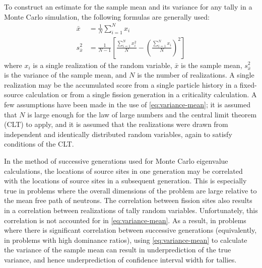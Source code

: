 To construct an estimate for the sample mean and its variance for any tally in a
Monte Carlo simulation, the following formulas are generally used:
\begin{align}
  \bar{x} &= \frac{1}{N} \sum_{i=1}^N x_i \\ 
  \label{eq:variance-mean} s^2_{\bar{x}} &= \frac{1}{N-1}
  \left [ \frac{\sum_{i=1}^N x_i^2}{N} - \left ( \frac{\sum_{i=1}^N x_i}{N}
    \right )^2 \right ]
\end{align}
where $x_i$ is a single realization of the random variable, $\bar{x}$ is the
sample mean, $s^2_{\bar{x}}$ is the variance of the sample mean, and $N$ is the
number of realizations. A single realization may be the accumulated score from a
single particle history in a fixed-source calculation or from a single fission
generation in a criticality calculation. A few assumptions have been made in the
use of \eqref{eq:variance-mean}; it is assumed that $N$ is large enough for the
law of large numbers and the central limit theorem (CLT) to apply, and it is
assumed that the realizations were drawn from independent and identically
distributed random variables, again to satisfy conditions of the CLT.

In the method of successive generations used for Monte Carlo eigenvalue
calculations, the locations of source sites in one generation may be correlated
with the locations of source sites in a subsequent generation. This is
especially true in problems where the overall dimensions of the problem are
large relative to the mean free path of neutrons. The correlation between
fission sites also results in a correlation between realizations of tally random
variables. Unfortunately, this correlation is not accounted for in
\eqref{eq:variance-mean}. As a result, in problems where there is significant
correlation between successive generations (equivalently, in problems with high
dominance ratios), using \eqref{eq:variance-mean} to calculate the variance of
the sample mean can result in underprediction of the true variance, and hence
underprediction of confidence interval width for tallies.

